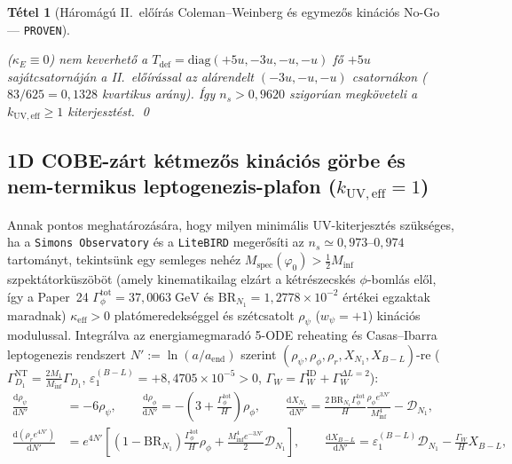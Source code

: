 \documentclass[11pt,a4paper]{article}
\newtheorem{theorem}{Tétel}
\begin{document}
\begin{theorem}[Háromágú II.~előírás Coleman--Weinberg és egymezős kinációs No-Go --- \textnormal{{\upshape\texttt{PROVEN}}}]
\begin{enumerate}
\begin{itemize}
($\kappa_E \equiv 0$) nem keverhető a $T_{\mathrm{def}} = \mathrm{diag}(+5u, -3u, -u, -u)$ fő $+5u$ sajátcsatornáján a II.~előírással az alárendelt $(-3u, -u, -u)$ csatornákon ($83/625 = 0{,}1328$ kvartikus arány). Így $n_s > 0{,}9620$ szigorúan megköveteli a $k_{\mathrm{UV,eff}} \ge 1$ kiterjesztést. \qed
  \end{itemize}
\end{enumerate}
\end{theorem}

\subsection{1D COBE-zárt kétmezős kinációs görbe és nem-termikus leptogenezis-plafon (\texorpdfstring{$k_{\mathrm{UV,eff}} = 1$}{k\_UV,eff = 1})}
Annak pontos meghatározására, hogy milyen minimális UV-kiterjesztés szükséges, ha a \texttt{Simons Observatory} és a \texttt{LiteBIRD} megerősíti az $n_s \simeq 0{,}973\text{--}0{,}974$ tartományt, tekintsünk egy semleges nehéz $M_{\mathrm{spec}}(\varphi_0) > \frac{1}{2}M_{\mathrm{inf}}$ szpektátorküszöböt (amely kinematikailag elzárt a kétrészecskés $\phi$-bomlás elől, így a Paper~24 $\Gamma_\phi^{\mathrm{tot}} = 37{,}0063\;\mathrm{GeV}$ és $\mathrm{BR}_{N_1} = 1{,}2778\times 10^{-2}$ értékei egzaktak maradnak) $\kappa_{\mathrm{eff}} > 0$ platómeredekséggel és szétcsatolt $\rho_\psi$ ($w_\psi = +1$) kinációs modulussal. Integrálva az energiamegmaradó 5-ODE reheating és Casas--Ibarra leptogenezis rendszert $N' := \ln(a/a_{\mathrm{end}})$ szerint $(\rho_\psi, \rho_\phi, \rho_r, X_{N_1}, X_{B-L})$-re ($\Gamma_{D_1}^{\mathrm{NT}} = \frac{2M_1}{M_{\mathrm{inf}}}\Gamma_{D_1}$, $\varepsilon_1^{(B-L)} = +8{,}4705\times 10^{-5} > 0$, $\Gamma_W = \Gamma_W^{\mathrm{ID}} + \Gamma_W^{\Delta L=2}$):
\begin{equation}
\begin{aligned}
  \frac{\mathrm{d}\rho_\psi}{\mathrm{d}N'} &= -6\rho_\psi, \qquad
  \frac{\mathrm{d}\rho_\phi}{\mathrm{d}N'} = -\left(3 + \frac{\Gamma_\phi^{\mathrm{tot}}}{H}\right)\rho_\phi, \qquad
  \frac{\mathrm{d}X_{N_1}}{\mathrm{d}N'} = \frac{2\,\mathrm{BR}_{N_1}\Gamma_\phi^{\mathrm{tot}}}{H}\frac{\rho_\phi e^{3N'}}{M_{\mathrm{inf}}^4} - \mathcal{D}_{N_1}, \\
  \frac{\mathrm{d}(\rho_r e^{4N'})}{\mathrm{d}N'} &= e^{4N'}\left[(1 - \mathrm{BR}_{N_1})\frac{\Gamma_\phi^{\mathrm{tot}}}{H}\rho_\phi + \frac{M_{\mathrm{inf}}^4 e^{-3N'}}{2}\mathcal{D}_{N_1}\right], \qquad
  \frac{\mathrm{d}X_{B-L}}{\mathrm{d}N'} = \varepsilon_1^{(B-L)}\mathcal{D}_{N_1} - \frac{\Gamma_W}{H}X_{B-L},
\end{aligned}
\label{eq:4ode-boltzmann}
\end{equation}
\end{document}
